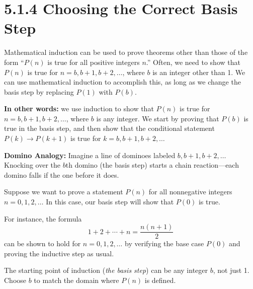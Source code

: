 \section*{5.1.4 Choosing the Correct Basis Step}

Mathematical induction can be used to prove theorems other than those of the
form “$P(n)$ is true for all positive integers $n$.” Often, we need to show that
$P(n)$ is true for $n = b, b+1, b+2, \ldots$, where $b$ is an integer other than
1. We can use mathematical induction to accomplish this, as long as we change
the basis step by replacing $P(1)$ with $P(b)$.

\textbf{In other words:} we use induction to show that $P(n)$ is true for
$n = b, b+1, b+2, \ldots$, where $b$ is any integer. We start by proving that
$P(b)$ is true in the basis step, and then show that the conditional statement
$P(k) \rightarrow P(k+1)$ is true for $k = b, b+1, b+2, \ldots$

\medskip
\textbf{Domino Analogy:} Imagine a line of dominoes labeled
$b, b+1, b+2, \ldots$  Knocking over the $b$th domino (the basis step) starts
a chain reaction—each domino falls if the one before it does.

\begin{example}
Suppose we want to prove a statement $P(n)$ for all nonnegative integers
$n=0,1,2,\ldots$ In this case, our basis step will show that $P(0)$ is true.

For instance, the formula
\[
1 + 2 + \cdots + n = \frac{n(n+1)}{2}
\]
can be shown to hold for $n=0,1,2,\ldots$ by verifying the base case $P(0)$
and proving the inductive step as usual.
\end{example}

\begin{tcolorbox}[colback=blue!5!white,colframe=blue!75!black,title=Key Idea]
The starting point of induction (\textit{the basis step}) can be any integer $b$,
not just 1. Choose $b$ to match the domain where $P(n)$ is defined.
\end{tcolorbox}

